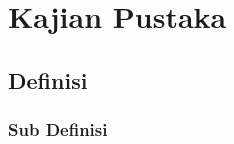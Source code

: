 \documentclass[../main.tex]{subfiles}
\begin{document}
\section{Kajian Pustaka}

\lipsum[1-5]

\subsection{Definisi}

\lipsum[6-8]

\subsubsection{Sub Definisi}
\lipsum[8-9]


\end{document}

